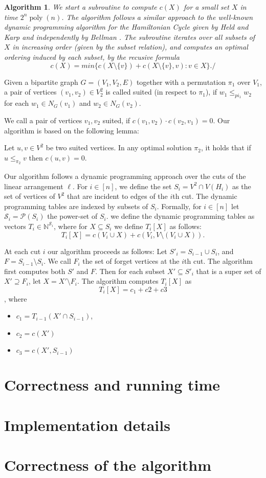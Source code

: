 \documentclass[a4paper,UKenglish,cleveref, autoref, thm-restate]{lipics-v2021}
\newtheorem{algorithm}{Algorithm}
\begin{document}
\begin{algorithm}\label{alg:subroutine}
    We start a subroutine to compute $c(X)$ for a small set $X$ in time $2^n\operatorname{poly}(n)$. The algorithm follows a similar approach to the well-known dynamic programming algorithm for the Hamiltonian Cycle given by Held and Karp \cite{DBLP:conf/acm/HeldK61} and independently by Bellman \cite{bellman1958combinatorial}. The subroutine iterates over all subsets of $X$ in increasing order (given by the subset relation), and computes an optimal ordering induced by each subset, by the recusive formula
    \[c(X) = min\{c(X\setminus\{v\}) + c(X\setminus \{v\}, v)\colon v \in X\}./\]    
\end{algorithm}

\begin{definition}
    Given a bipartite graph $G= (V_1, V_2, E)$ together with a permutation $\pi_1$ over $V_1$, a pair of vertices $(v_1,v_2)\in V_2^2$ is called suited (in respect to $\pi_1$), if $w_1\leq_{pi_1}w_2$ for each $w_1\in N_G(v_1)$ and $w_2\in N_G(v_2)$.
\end{definition}
We call a pair of vertices $v_1, v_2$ suited, if $c(v_1,v_2)\cdot c(v_2,v_1) = 0$.
Our algorithm is based on the following lemma:
\begin{lemma}
    Let $u,v \in V^2$ be two suited vertices. In any optimal solution $\pi_2$, it holds that if $u\leq_{\pi_2} v$ then $c(u,v) = 0$.
\end{lemma}
Our algorithm follows a dynamic programming approach over the cuts of the linear arrangement $\ell$.
For $i\in[n]$, we define the set $S_i = V^2 \cap V(H_i)$ as the set of vertices of $V^2$ that are incident to edges of the $i$th cut.
The dynamic programming tables are indexed by subsets of $S_i$.
Formally, for $i\in [n]$ let $\mathcal{S}_i = \mathcal{P}(S_i)$ the power-set of $S_i$. we define the dynamic programming tables as vectors $T_i \in \mathbb{N}^{\mathcal{S}_i}$, where for $X\subseteq S_i$ we define $T_i[X]$ as follows:
\[T_i[X] = c(V_i\cup X) + c(V_i, V\setminus (V_i\cup X)).\]

At each cut $i$ our algorithm proceeds as follows: 
Let $S'_i = S_{i-1} \cup S_i$, and $F = S_{i-1} \setminus S_{i}$. We call $F_i$ the set of forget vertices at the $i$th cut. The algorithm first computes both $S'$ and $F$. Then for each subset $X' \subseteq S'_i$ that is a super set of $X' \supseteq F_i$, let $X = X'\setminus F_i$. The algorithm computes $T_{i}[X]$ as
\[T_i[X] = c_1 + c2 + c3\],
where
\begin{itemize}
    \item $c_1 = T_{i-1}(X'\cap S_{i-1})$,
    \item $c_2 = c(X')$
    \item $c_3 = c(X', S_{i-1})$
\end{itemize}

\section{Correctness and running time}
\section{Implementation details}

\section{Correctness of the algorithm}

\end{document}
